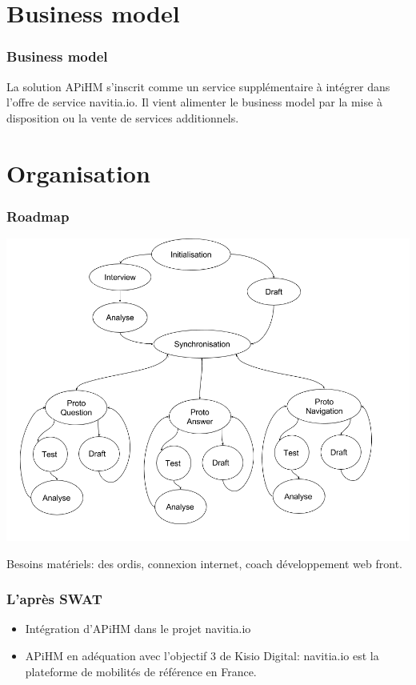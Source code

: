 \documentclass[table]{beamer}
\begin{document}
\section{Business model}

\begin{frame}
  \frametitle{Business model}

  La solution APiHM s'inscrit comme un service supplémentaire à
  intégrer dans l'offre de service navitia.io. Il vient alimenter le
  business model par la mise à disposition ou la vente de services
  additionnels.
\end{frame}

\section{Organisation}

\begin{frame}
  \frametitle{Roadmap}

  {\centering\includegraphics[width=0.7\linewidth]{images/roadmap}

  }

  Besoins matériels: des ordis, connexion internet, coach
  développement web front.
\end{frame}

\begin{frame}
  \frametitle{L'après SWAT}

  \begin{itemize}
  \item Intégration d'APiHM dans le projet navitia.io
  \item APiHM en adéquation avec l'objectif 3 de Kisio Digital:
    navitia.io est la plateforme de mobilités de référence en France.
  \end{itemize}
\end{frame}
\end{document}
